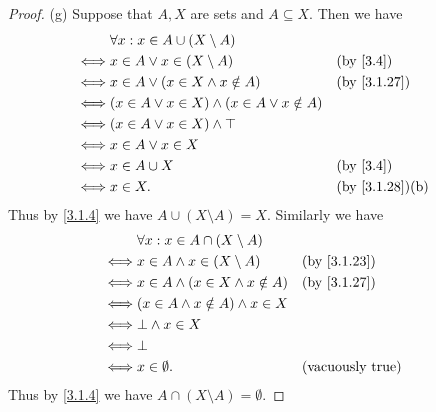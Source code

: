\begin{proof}{(g)}
  Suppose that \(A, X\) are sets and \(A \subseteq X\).
  Then we have
  \begin{align*}
         & \forall x : x \in A \cup (X \setminus A)                                                 \\
    \iff & x \in A \lor x \in (X \setminus A)                     &  & \text{(by \cref{3.4})}       \\
    \iff & x \in A \lor (x \in X \land x \notin A)                &  & \by{3.1.27}                  \\
    \iff & (x \in A \lor x \in X) \land (x \in A \lor x \notin A)                                   \\
    \iff & (x \in A \lor x \in X) \land \top                                                        \\
    \iff & x \in A \lor x \in X                                                                     \\
    \iff & x \in A \cup X                                         &  & \text{(by \cref{3.4})}       \\
    \iff & x \in X.                                               &  & \text{(by \cref{3.1.28})(b)}
  \end{align*}
  Thus by \cref{3.1.4} we have \(A \cup (X \setminus A) = X\).
  Similarly we have
  \begin{align*}
         & \forall x : x \in A \cap (X \setminus A)                              \\
    \iff & x \in A \land x \in (X \setminus A)      &  & \by{3.1.23}             \\
    \iff & x \in A \land (x \in X \land x \notin A) &  & \by{3.1.27}             \\
    \iff & (x \in A \land x \notin A) \land x \in X                              \\
    \iff & \bot \land x \in X                                                    \\
    \iff & \bot                                                                  \\
    \iff & x \in \emptyset.                         &  & \text{(vacuously true)}
  \end{align*}
  Thus by \cref{3.1.4} we have \(A \cap (X \setminus A) = \emptyset\).
\end{proof}

